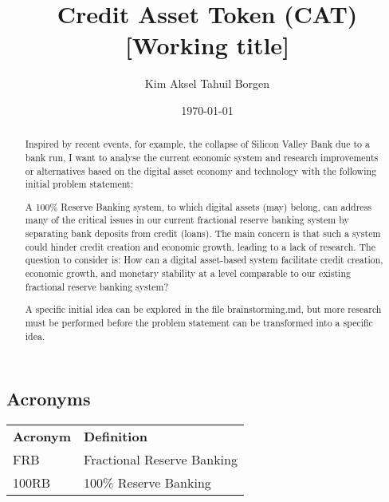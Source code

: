 \documentclass{article}
\title{Credit Asset Token (CAT) [Working title]}
\author{Kim Aksel Tahuil Borgen}
\date{\today}
\begin{document}
\maketitle
\begin{abstract}
    Inspired by recent events, for example, the collapse of Silicon Valley Bank due to a bank run, I want to analyse the current economic system and research improvements or alternatives based on the digital asset economy and technology with the following initial problem statement:

    A 100\% Reserve Banking system, to which digital assets (may) belong, can address many of the critical issues in our current fractional reserve banking system by separating bank deposits from credit (loans). The main concern is that such a system could hinder credit creation and economic growth, leading to a lack of research. The question to consider is: How can a digital asset-based system facilitate credit creation, economic growth, and monetary stability at a level comparable to our existing fractional reserve banking system? 
    
    A specific initial idea can be explored in the file brainstorming.md, but more research must be performed before the problem statement can be transformed into a specific idea. 
\end{abstract}

\subsection{Acronyms}

\begin{tabular}{ll}
\textbf{Acronym} & \textbf{Definition} \\
FRB & Fractional Reserve Banking \\
100RB & 100\% Reserve Banking \\
\end{tabular}





\end{document}
